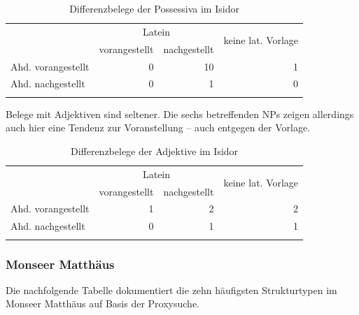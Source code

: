 \begin{table}
\centering
\begin{tabular}{lrrr}
\lsptoprule
                   & \multicolumn{2}{c}{Latein} & \multirow{2}{*}{keine lat. Vorlage}\\
 \cmidrule(lr){2-3}
                   & vorangestellt & nachgestellt & \\ \midrule
Ahd. vorangestellt & 0                  & 10                 & 1                    \\
Ahd. nachgestellt  & 0                  & 1                 & 0                    \\ \lspbottomrule
\end{tabular}
\caption{Differenzbelege der Possessiva im Isidor}
\label{tab:diff-poss-isidor}
\end{table}

Belege mit Adjektiven sind seltener. Die sechs betreffenden NPs zeigen allerdings auch hier eine Tendenz zur Voranstellung -- auch entgegen der Vorlage. 

\begin{table}
\centering
\begin{tabular}{lrrr}
\lsptoprule
                   & \multicolumn{2}{c}{Latein} & \multirow{2}{*}{keine lat. Vorlage}\\
 \cmidrule(lr){2-3}
                   & vorangestellt & nachgestellt & \\ \midrule
Ahd. vorangestellt & 1                  & 2                 & 2                    \\
Ahd. nachgestellt  & 0                  & 1                 & 1                    \\ \lspbottomrule
\end{tabular}
\caption{Differenzbelege der Adjektive im Isidor}
\label{tab:diff-adj.-isidor}
\end{table}

\subsubsection{Monseer Matthäus}

Die nachfolgende Tabelle dokumentiert die zehn häufigsten Strukturtypen im Monseer Matthäus auf Basis der Proxysuche. 

